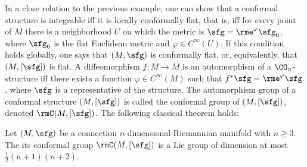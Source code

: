 \begin{example}
    In a close relation to the previous example, one can show that a conformal structure is integrable iff it is locally conformally flat, that is, iff for every point of $M$ there is a neighborhood $U$ on which the metric is $\sfg=\rme^{\varphi}\sfg_0$, where $\sfg_0$ is the flat Euclidean metric and $\varphi\in C^\infty(U)$. If this condition holds globally, one says that $(M,\sfg)$ is conformally flat, or, equivalently, that $(M,[\sfg])$ is flat. A diffeomorphism $f:M\to M$ is an automorphism of a $\CO_n$-structure iff there exists a function $\varphi\in C^\infty(M)$ such that $f^\ast\sfg=\rme^\varphi \sfg$, where $\sfg$ is a representative of the structure. The automorphism group of a conformal structure $(M,[\sfg])$ is called the conformal group of $(M,[\sfg])$, denoted $\rmC(M,[\sfg])$. The following classical theorem holds: 
    \begin{thm}\label{thm Liouville conformal}
        Let $(M,\sfg)$ be a connection $n$-dimensional Riemannian manifold with $n\geq 3$. The its conformal group $\rmC(M,[\sfg])$ is a Lie group of dimension at most $\frac12(n+1)(n+2)$.
    \end{thm}
\end{example}


